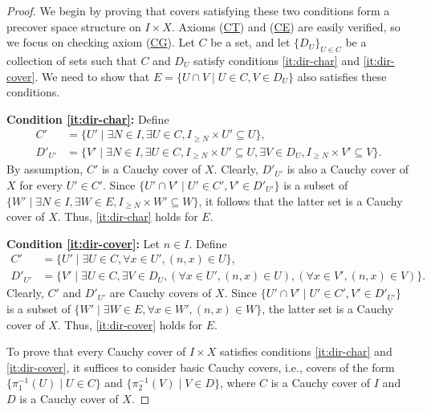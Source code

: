 \documentclass[reqno]{amsart}
\newcommand{\axref}[1]{(\hyperref[ax:#1]{#1})}
\theoremstyle{definition}
\theoremstyle{remark}
\numberwithin{figure}{section}
\begin{document}
\begin{proof}

We begin by proving that covers satisfying these two conditions form a precover space structure on $I \times X$.
Axioms \axref{CT} and \axref{CE} are easily verified, so we focus on checking axiom \axref{CG}.
Let $C$ be a set, and let $\{ D_U \}_{U \in C}$ be a collection of sets such that $C$ and $D_U$ satisfy conditions \eqref{it:dir-char} and \eqref{it:dir-cover}.
We need to show that $E = \{ U \cap V \mid U \in C, V \in D_U \}$ also satisfies these conditions.

\textbf{Condition \eqref{it:dir-char}:}
Define
\begin{align*}
C' & = \{ U' \mid \exists N \in I, \exists U \in C, I_{\geq N} \times U' \subseteq U \}, \\
D'_{U'} & = \{ V' \mid \exists N \in I, \exists U \in C, I_{\geq N} \times U' \subseteq U, \exists V \in D_U, I_{\geq N} \times V' \subseteq V \}.
\end{align*}
By assumption, $C'$ is a Cauchy cover of $X$.
Clearly, $D'_{U'}$ is also a Cauchy cover of $X$ for every $U' \in C'$.
Since $\{ U' \cap V' \mid U' \in C', V' \in D'_{U'} \}$ is a subset of $\{ W' \mid \exists N \in I, \exists W \in E, I_{\geq N} \times W' \subseteq W \}$, it follows that the latter set is a Cauchy cover of $X$.
Thus, \eqref{it:dir-char} holds for $E$.

\textbf{Condition \eqref{it:dir-cover}:}
Let $n \in I$. Define
\begin{align*}
C' & = \{ U' \mid \exists U \in C, \forall x \in U', (n,x) \in U \}, \\
D'_{U'} & = \{ V' \mid \exists U \in C, \exists V \in D_U, (\forall x \in U', (n,x) \in U), (\forall x \in V', (n,x) \in V) \}.
\end{align*}
Clearly, $C'$ and $D'_{U'}$ are Cauchy covers of $X$.
Since $\{ U' \cap V' \mid U' \in C', V' \in D'_{U'} \}$ is a subset of $\{ W' \mid \exists W \in E, \forall x \in W', (n,x) \in W \}$, the latter set is a Cauchy cover of $X$.
Thus, \eqref{it:dir-cover} holds for $E$.

To prove that every Cauchy cover of $I \times X$ satisfies conditions \eqref{it:dir-char} and \eqref{it:dir-cover}, it suffices to consider basic Cauchy covers,
i.e., covers of the form $\{ \pi_1^{-1}(U) \mid U \in C \}$ and $\{ \pi_2^{-1}(V) \mid V \in D \}$, where $C$ is a Cauchy cover of $I$ and $D$ is a Cauchy cover of $X$.


\end{proof}
\end{document}
